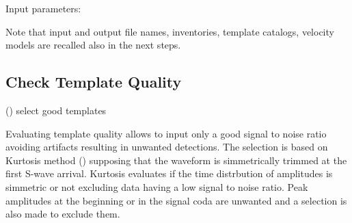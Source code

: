 \documentclass[a4paper,10pt,english]{sphinxmanual}
\begin{document}
Input parameters:

\begin{sphinxVerbatim}[commandchars=\\\{\}]
         
  
 
\end{sphinxVerbatim}

Note that input and output file names, inventories, template catalogs, velocity models are recalled also in the next steps.


\subsection{Check Template Quality}
\label{\detokenize{tutorial:check-template-quality}}
({\hyperref[\detokenize{sub/input.template_check::doc}]{}}) select good templates

Evaluating template quality allows to input only a good signal to noise ratio avoiding artifacts resulting in unwanted detections. The selection is based on Kurtosis method () supposing that the waveform is simmetrically trimmed at the first S-wave arrival. Kurtosis evaluates if the time distrbution of amplitudes is simmetric or not excluding data having a low signal to noise ratio.
Peak amplitudes at the beginning or in the signal coda are unwanted and a selection is also made to exclude them.
\end{document}
